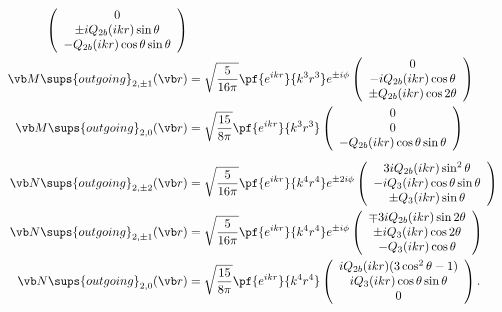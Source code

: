 \documentclass[letterpaper]{article}
\begin{document}
\begin{align*}
    \left(\begin{array}{c}
    0 				  \\
   \pm  iQ_{2b}(ikr)\sin\theta	  \\
    -Q_{2b}(ikr)\cos\theta\sin\theta
    \end{array}\right)
\\
 \vb M\sups{outgoing}_{2,\pm 1}(\vb r)
  &=\sqrt\frac{5}{16\pi}\pf{e^{ikr}}{k^3 r^3} e^{\pm i\phi}
    \left(\begin{array}{c}
    0                            \\
    -iQ_{2b}(ikr)\cos\theta  \\
    \pm Q_{2b}(ikr)\cos 2\theta
    \end{array}\right)
\\
 \vb M\sups{outgoing}_{2,0}(\vb r)
  &=\sqrt\frac{15}{8\pi}\pf{e^{ikr}}{k^3 r^3}
    \left(\begin{array}{c}
    0 \\ 
    0 \\ 
    -Q_{2b}(ikr)\cos \theta \sin\theta
    \end{array}\right)
\\[5pt]
 \vb N\sups{outgoing}_{2,\pm 2}(\vb r)
  &=\sqrt\frac{5}{16\pi}\pf{e^{ikr}}{k^4 r^4} e^{\pm 2i\phi}
    \left(\begin{array}{c}
   3iQ_{2b}(ikr) \sin^2 \theta                          \\
   -iQ_3(ikr) \cos\theta \sin\theta   \\
   \pm Q_3(ikr) \sin\theta 
    \end{array}\right)
\\
 \vb N\sups{outgoing}_{2,\pm 1}(\vb r)
  &=\sqrt\frac{5}{16\pi}\pf{e^{ikr}}{k^4 r^4} e^{\pm i\phi}
    \left(\begin{array}{c}
   \mp 3iQ_{2b}(ikr) \sin 2\theta               \\
   \pm iQ_3(ikr) \cos 2\theta  \\
   -Q_3(ikr) \cos\theta
    \end{array}\right)
\\
 \vb N\sups{outgoing}_{2,0}(\vb r)
  &=\sqrt\frac{15}{8\pi}\pf{e^{ikr}}{k^4 r^4}
    \left(\begin{array}{c}
   iQ_{2b}(ikr)(3\cos^2 \theta -1)                    \\
   iQ_3(ikr) \cos \theta \sin\theta \\
   0
    \end{array}\right).
\end{align*}
\end{document}
